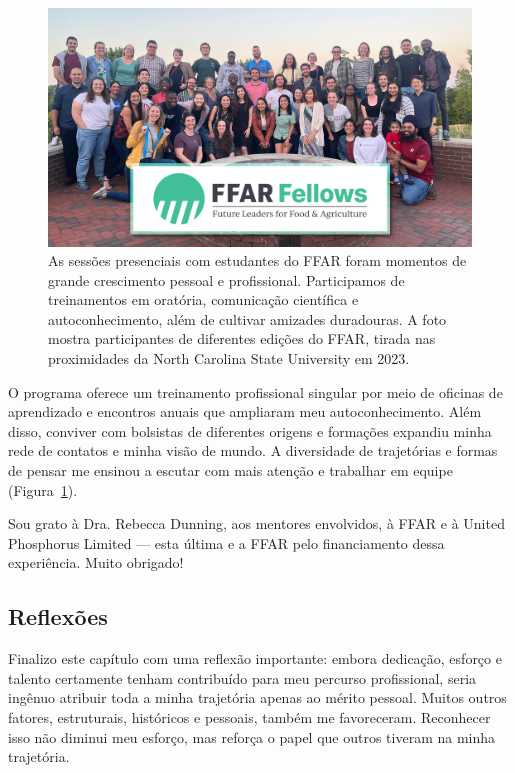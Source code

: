 \documentclass[12pt,a4paper,oneside]{book}
\newcommand{\NCState}{North Carolina State University}
\newcommand{\HeroFigPad}{\vspace{-1cm}}
\begin{document}
\begin{figure}[h]
\HeroFigPad
\begin{center}
  \includegraphics[height=0.4\textheight, keepaspectratio]{images/ffar_2023.jpg}
\end{center}
  \caption{
    As sessões presenciais com estudantes do FFAR foram momentos de grande crescimento pessoal e profissional. Participamos de 
    treinamentos em oratória, comunicação científica e autoconhecimento, além de cultivar amizades duradouras. A foto mostra 
    participantes de diferentes edições do FFAR, tirada nas proximidades da \NCState{} em 2023.
  }
  \label{fig_ffar}
\end{figure}
  
O programa oferece um treinamento profissional singular por meio de oficinas de aprendizado e encontros anuais que ampliaram meu autoconhecimento.
Além disso, conviver com bolsistas de diferentes origens e formações expandiu minha rede de contatos e minha visão de mundo.
A diversidade de trajetórias e formas de pensar me ensinou a escutar com mais atenção e trabalhar em equipe (Figura~\ref{fig_ffar}).

Sou grato à Dra. Rebecca Dunning, aos mentores envolvidos, à FFAR e à United Phosphorus Limited — esta última 
e a FFAR pelo financiamento dessa experiência. Muito obrigado!
    
    
\subsection{Reflexões}

Finalizo este capítulo com uma reflexão importante: embora dedicação, esforço e talento certamente 
tenham contribuído para meu percurso profissional, seria ingênuo atribuir toda a minha trajetória 
apenas ao mérito pessoal. Muitos outros fatores, estruturais, históricos e pessoais, também me 
favoreceram. Reconhecer isso não diminui meu esforço, mas reforça o papel que outros tiveram na minha trajetória.
\end{document}

